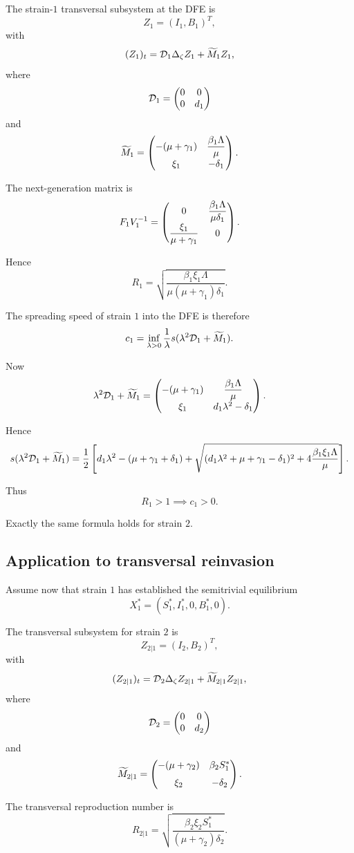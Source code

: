The strain-$1$ transversal subsystem at the DFE is
$$
Z_1=(I_1,B_1)^T,
$$
with
$$
(Z_1)_t
=
\mathcal D_1\Delta_\zeta Z_1
+
\widetilde M_1Z_1,
$$
where
$$
\mathcal D_1=
\begin{pmatrix}
0&0\\
0&d_1
\end{pmatrix}
$$
and
$$
\widetilde M_1=
\begin{pmatrix}
-(\mu+\gamma_1)
&
\dfrac{\beta_1\Lambda}{\mu}
\\[6pt]
\xi_1
&
-\delta_1
\end{pmatrix} .
$$

The next-generation matrix is
$$
F_1V_1^{-1}
=
\begin{pmatrix}
0
&
\dfrac{\beta_1\Lambda}{\mu\delta_1}
\\[6pt]
\dfrac{\xi_1}{\mu+\gamma_1}
&
0
\end{pmatrix} .
$$

Hence
$$
R_1
=
\sqrt{
\frac{
\beta_1\xi_1\Lambda
}{
\mu(\mu+\gamma_1)\delta_1
}
}.
$$

The spreading speed of strain $1$ into the DFE is therefore
$$
c_1
=
\inf_{\lambda>0}
\frac1\lambda
s(\lambda^2\mathcal D_1+\widetilde M_1).
$$

Now
$$
\lambda^2\mathcal D_1+\widetilde M_1
=
\begin{pmatrix}
-(\mu+\gamma_1)
&
\dfrac{\beta_1\Lambda}{\mu}
\\[6pt]
\xi_1
&
d_1\lambda^2-\delta_1
\end{pmatrix} .
$$

Hence
$$
s(\lambda^2\mathcal D_1+\widetilde M_1)
=
\frac12
\left[
d_1\lambda^2-(\mu+\gamma_1+\delta_1)
+
\sqrt{
(d_1\lambda^2+\mu+\gamma_1-\delta_1)^2
+
4\dfrac{\beta_1\xi_1\Lambda}{\mu}
}
\right].
$$

Thus
$$
R_1>1
\implies
c_1>0.
$$

Exactly the same formula holds for strain $2$.

\subsection{Application to transversal reinvasion}
\label{ss:kpp-reinvasion}

Assume now that strain $1$ has established the semitrivial equilibrium
$$
X_1^*
=
(S_1^*,I_1^*,0,B_1^*,0).
$$

The transversal subsystem for strain $2$ is
$$
Z_{2|1}=(I_2,B_2)^T,
$$
with
$$
(Z_{2|1})_t
=
\mathcal D_2\Delta_\zeta Z_{2|1}
+
\widetilde M_{2|1}Z_{2|1},
$$
where
$$
\mathcal D_2=
\begin{pmatrix}
0&0\\
0&d_2
\end{pmatrix}
$$
and
$$
\widetilde M_{2|1}
=
\begin{pmatrix}
-(\mu+\gamma_2)
&
\beta_2S_1^*
\\[6pt]
\xi_2
&
-\delta_2
\end{pmatrix} .
$$

The transversal reproduction number is
$$
R_{2|1}
=
\sqrt{
\frac{
\beta_2\xi_2S_1^*
}{
(\mu+\gamma_2)\delta_2
}
}.
$$

